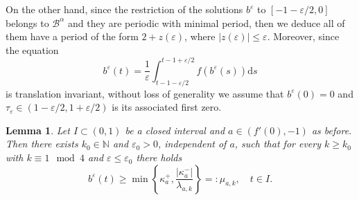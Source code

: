 \documentclass[a4paper,11pt]{article}
\theoremstyle{plain}
\newtheorem{lem}[thm]{Lemma}
\theoremstyle{definition}
\theoremstyle{definition}
\newcommand{\N}{\mathbb{N}}
\newcommand{\B}{\mathcal{B}}
\newcommand{\dd}{\mathrm{d}}
\numberwithin{equation}{section}
\begin{document}
On the other hand, since the restriction of the solutions $b^\varepsilon$ to $[-1-\varepsilon/2,0]$ belongs to $\B^\alpha$ and they are periodic with minimal period, then we deduce all of them have a period of the form $2+z(\varepsilon)$, where $|z(\varepsilon)|\leq \varepsilon$. Moreover, since the equation
\[
    b^\varepsilon(t) = \frac{1}{\varepsilon} \int_{t-1-\varepsilon/2}^{t-1+\varepsilon/2} f(b^\varepsilon(s)) \dd s
\]
is translation invariant, without loss of generality we assume that  $b^\varepsilon(0)=0$ and $\tau_\varepsilon\in(1-\varepsilon/2, 1+\varepsilon/2)$ is its associated first zero.

\begin{lem}
Let $I\subset (0,1)$ be a closed interval and $a\in(f'(0),-1)$ as before. Then there exists $k_0\in\N$ and $\varepsilon_0>0$, independent of $a$, such that for every $k\geq k_0$ with $k\equiv 1 \mod{4}$ and $\varepsilon\leq \varepsilon_0$ there holds
\begin{equation}
	b^\varepsilon(t) \geq \min\left\{ \kappa_a^+, \frac{|\kappa_a^-|}{\lambda_{a,k}} \right\} =: \mu_{a,k}, \quad t\in I.
\end{equation}
\end{lem}
\end{document}
